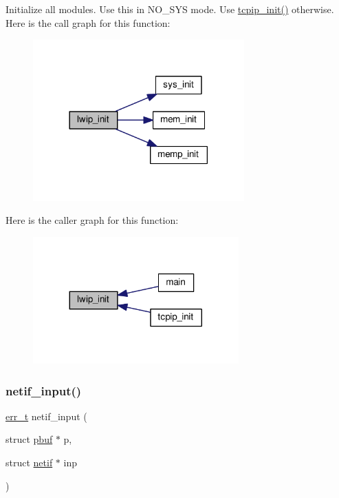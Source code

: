 Initialize all modules. Use this in N\+O\+\_\+\+S\+YS mode. Use \hyperlink{group__lwip__os_ga1f3a88b8df6ba3b9ed1c00e0a305e3db}{tcpip\+\_\+init()} otherwise. Here is the call graph for this function\+:
\nopagebreak
\begin{figure}[H]
\begin{center}
\leavevmode
\includegraphics[width=230pt]{group__lwip__nosys_ga0c1a18439524d2f4a5e51d25c0ca2ce9_cgraph}
\end{center}
\end{figure}
Here is the caller graph for this function\+:
\nopagebreak
\begin{figure}[H]
\begin{center}
\leavevmode
\includegraphics[width=224pt]{group__lwip__nosys_ga0c1a18439524d2f4a5e51d25c0ca2ce9_icgraph}
\end{center}
\end{figure}
\mbox{\label{group__lwip__nosys_ga5532f93d68c874fb99c681bff2165385}} 
\subsubsection{\texorpdfstring{netif\+\_\+input()}{netif\_input()}}
{\footnotesize\ttfamily \hyperlink{group__infrastructure__errors_gaf02d9da80fd66b4f986d2c53d7231ddb}{err\+\_\+t} netif\+\_\+input (\begin{DoxyParamCaption}\item[{struct \hyperlink{structpbuf}{pbuf} $\ast$}]{p,  }\item[{struct \hyperlink{structnetif}{netif} $\ast$}]{inp }\end{DoxyParamCaption})}

